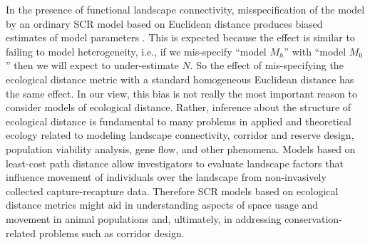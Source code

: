 In the presence of functional landscape connectivity, misspecification
of the model by an ordinary SCR model based on Euclidean distance
produces biased estimates of model parameters
 \citep{royle_etal:2012ecol}.
 This is expected because the effect is similar
to failing to model heterogeneity, i.e., if we mis-specify ``model
$M_h$'' \citep{otis_etal:1978} with ``model $M_0$''
\citep{otis_etal:1978} then we will expect to under-estimate $N$. So
the effect of mis-specifying the ecological distance metric with a
standard homogeneous Euclidean distance has the same effect.
In our view, this bias is not really the most important reason to
consider models of ecological distance. Rather, inference about the
structure of ecological distance is fundamental to many problems in
applied and theoretical ecology related to modeling landscape
connectivity, corridor and reserve design, population viability
analysis, gene flow, and other phenomena.  Models based on least-cost
path distance allow investigators to evaluate landscape factors that
influence movement of individuals over the landscape from
non-invasively collected capture-recapture data.  Therefore SCR models
based on ecological distance metrics might aid in understanding
aspects of space usage and movement in animal populations and,
ultimately, in addressing conservation-related problems such as
corridor design.





























